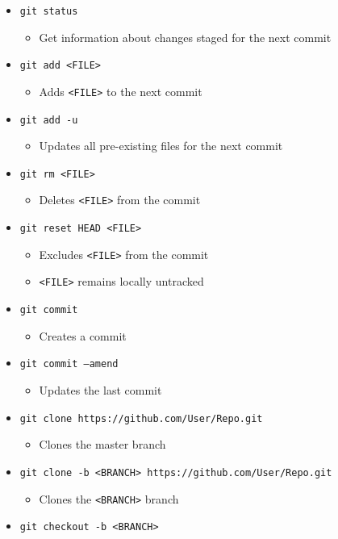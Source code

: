 \documentclass{article}
\begin{document}
\begin{itemize}
\item \texttt{git status}
\begin{itemize}
\item Get information about changes staged for the next commit
\end{itemize}
\item \texttt{git add <FILE>} 
\begin{itemize}
\item Adds \texttt{<FILE>} to the next commit
\end{itemize}
\item \texttt{git add -u}
\begin{itemize}
\item Updates all pre-existing files for the next commit
\end{itemize}
\item \texttt{git rm <FILE>}
\begin{itemize}
\item Deletes \texttt{<FILE>} from the commit
\end{itemize}
\item \texttt{git reset HEAD <FILE>}
\begin{itemize}
\item Excludes \texttt{<FILE>} from the commit
\item \texttt{<FILE>} remains locally untracked
\end{itemize}
\item \texttt{git commit}
\begin{itemize}
\item Creates a commit
\end{itemize}
\item \texttt{git commit --amend}
\begin{itemize}
\item Updates the last commit
\end{itemize}
\item \texttt{git clone https://github.com/User/Repo.git}
\begin{itemize}
\item Clones the master branch
\end{itemize}
\item \texttt{git clone -b <BRANCH> https://github.com/User/Repo.git} 
\begin{itemize}
\item Clones the \texttt{<BRANCH>} branch
\end{itemize}
\item \texttt{git checkout -b <BRANCH>}

\end{itemize}
\end{document}
